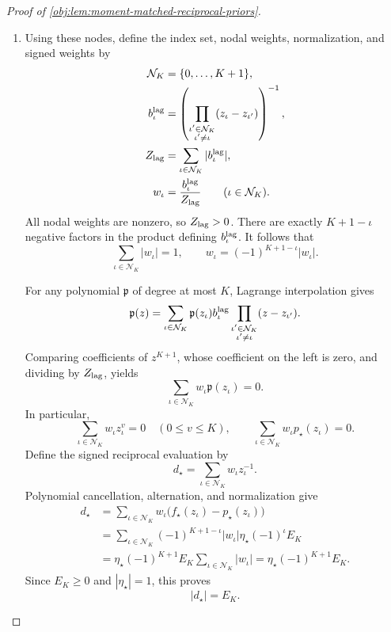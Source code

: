 \documentclass[11pt]{article}
\begin{document}
\begin{proof}[Proof of \cref{obj:lem:moment-matched-reciprocal-priors}]
\begin{enumerate}
\item Using these nodes, define the index set, nodal weights, normalization, and signed weights by
\[
\begin{aligned}
\mathcal N_K&=\{0,\ldots,K+1\},\\
b_\iota^{\rm lag}
&=\left(\prod_{\substack{\iota'\in\mathcal N_K\\\iota'\ne\iota}}
(z_\iota-z_{\iota'})\right)^{-1},\\
Z_{\rm lag}&=\sum_{\iota\in\mathcal N_K}|b_\iota^{\rm lag}|,\\
w_\iota&=\frac{b_\iota^{\rm lag}}{Z_{\rm lag}}
\qquad(\iota\in\mathcal N_K).
\end{aligned}
\]
All nodal weights are nonzero, so \(Z_{\rm lag}>0\). There are exactly \(K+1-\iota\) negative factors in the product defining \(b_\iota^{\rm lag}\). It follows that
\[
\sum_{\iota\in\mathcal N_K}|w_\iota|=1,
\qquad
w_\iota=(-1)^{K+1-\iota}|w_\iota|.
\]

For any polynomial \(\mathfrak p\) of degree at most \(K\), Lagrange interpolation gives
\[
\mathfrak p(z)
=\sum_{\iota\in\mathcal N_K}
\mathfrak p(z_\iota)b_\iota^{\rm lag}
\prod_{\substack{\iota'\in\mathcal N_K\\\iota'\ne\iota}}
(z-z_{\iota'}).
\]
Comparing coefficients of \(z^{K+1}\), whose coefficient on the left is zero, and dividing by \(Z_{\rm lag}\), yields
\[
\sum_{\iota\in\mathcal N_K}w_\iota\mathfrak p(z_\iota)=0.
\]
In particular,
\[
\sum_{\iota\in\mathcal N_K}w_\iota z_\iota^v=0
\quad(0\le v\le K),
\qquad
\sum_{\iota\in\mathcal N_K}w_\iota p_\star(z_\iota)=0.
\]
Define the signed reciprocal evaluation by
\[
d_\star=\sum_{\iota\in\mathcal N_K}w_\iota z_\iota^{-1}.
\]
Polynomial cancellation, alternation, and normalization give
\[
\begin{aligned}
d_\star
&=\sum_{\iota\in\mathcal N_K}
  w_\iota\bigl(f_\star(z_\iota)-p_\star(z_\iota)\bigr)\\
&=\sum_{\iota\in\mathcal N_K}
  (-1)^{K+1-\iota}|w_\iota|
  \eta_\star(-1)^\iota E_K\\
&=\eta_\star(-1)^{K+1}E_K
  \sum_{\iota\in\mathcal N_K}|w_\iota|
=\eta_\star(-1)^{K+1}E_K.
\end{aligned}
\]
Since \(E_K\ge0\) and \(|\eta_\star|=1\), this proves
\[
|d_\star|=E_K.
\]


\end{enumerate}
\end{proof}
\end{document}
